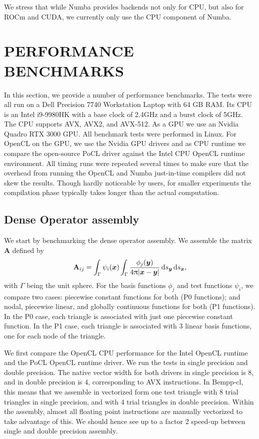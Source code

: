 \documentclass{IEEEcsmag}
\newcommand{\bvec}[1]{\boldsymbol{#1}}
\def\bx{\bvec{x}}
\def\by{\bvec{y}}
\newcommand{\ds}[1][]{\,\mathrm{d}s\ifthenelse{\equal{#1}{}}{}{_{#1}}}
\newcommand{\dmat}[1]{\mathbf{#1}}
\begin{document}
We stress that while Numba provides backends not only for CPU, but also for ROCm and CUDA, we currently only use the CPU component of Numba.

\section{PERFORMANCE BENCHMARKS}

In this section, we provide a number of performance benchmarks. The tests were all run on a Dell Precision 7740 Workstation Laptop with 64 GB RAM. Its CPU is an Intel i9-9980HK with a base clock of 2.4GHz and a burst clock of 5GHz. The CPU supports AVX, AVX2, and AVX-512.
As a GPU we use an Nvidia Quadro RTX 3000 GPU. All benchmark tests were performed in Linux. For OpenCL on the GPU, we use the Nvidia GPU drivers and as CPU runtime we compare the open-source PoCL driver against the Intel CPU OpenCL runtime environment. All timing runs were repeated several times to make sure that the overhead from running the OpenCL and Numba just-in-time compilers did not skew the results. Though hardly noticeable by users, for smaller experiments the compilation phase typically takes longer than the actual computation.

\subsection{Dense Operator assembly}
We start by benchmarking the dense operator assembly. We assemble the matrix $\dmat{A}$ defined by
$$
\dmat{A}_{ij} = \int_{\Gamma}\psi_i(\bx)\int_{\Gamma}\frac{\phi_j(\by)}{4\uppi |\bx -\by|}\ds[\by]\ds[\bx],
$$
with $\Gamma$ being the unit sphere. For the basis functions $\phi_j$ and test functions $\psi_i$, we compare two cases: piecewise constant functions for both (P0 functions); and nodal, piecewise linear, and globally continuous functions for both (P1 functions). In the P0 case, each triangle is associated with just one piecewise constant function. In the P1 case, each triangle is associated with $3$ linear basis functions, one for each node of the triangle.

We first compare the OpenCL CPU performance for the Intel OpenCL runtime and the PoCL OpenCL runtime driver. We run the tests in single precision and double precision. The native vector width for both drivers in single precision is $8$, and in double precision is $4$, corresponding to AVX instructions. In Bempp-cl, this means that we assemble in vectorized form one test triangle with $8$ trial triangles in single precision, and with $4$ trial triangles in double precision. Within the assembly, almost all floating point instructions are manually vectorized to take advantage of this. We should hence see up to a factor 2 speed-up between single and double precision assembly.
\end{document}
